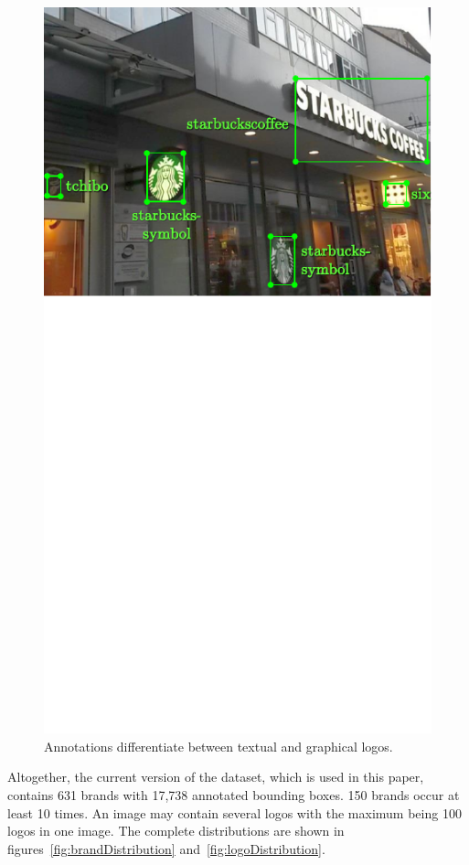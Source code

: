\documentclass[a4paper,twoside]{article}
\begin{document}
\begin{figure}%
\centering%
\includegraphics[width=\linewidth, trim=0cm 9cm 0cm 0cm, clip]{img/annotatedSample.pdf}%
\caption{Annotations differentiate between textual and graphical logos.}%
\label{fig:annotatedSample}
\end{figure}%
%
Altogether, the current version of the dataset, which is used in this paper, contains 631 brands with 17,738 annotated bounding boxes. 150 brands occur at least 10 times. An image may contain several logos with the maximum being 100 logos in one image. The complete distributions are shown in figures~\ref{fig:brandDistribution} and~\ref{fig:logoDistribution}. 
\end{document}

